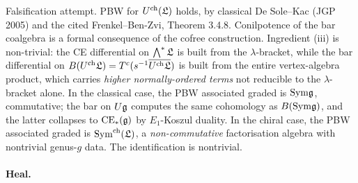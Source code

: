 Falsification attempt. PBW for $U^{\mathrm{ch}}(\mathfrak{L})$ holds, by
classical De Sole--Kac (JGP 2005) and the cited Frenkel--Ben-Zvi,
Theorem 3.4.8. Conilpotence of the bar coalgebra is a formal
consequence of the cofree construction. Ingredient (iii) is
non-trivial: the CE differential on $\bigwedge^* \mathfrak{L}$ is built
from the $\lambda$-bracket, while the bar differential on
$B(U^{\mathrm{ch}}\mathfrak{L}) = T^c(s^{-1}\overline{U^{\mathrm{ch}}\mathfrak{L}})$
is built from the entire vertex-algebra product, which carries
\emph{higher normally-ordered terms} not reducible to the
$\lambda$-bracket alone. In the classical case, the PBW associated
graded is $\mathrm{Sym} \mathfrak{g}$, commutative; the bar on $U\mathfrak{g}$ computes
the same cohomology as $B(\mathrm{Sym}\mathfrak{g})$, and the latter
collapses to $\mathrm{CE}_*(\mathfrak{g})$ by $E_1$-Koszul duality. In the chiral
case, the PBW associated graded is $\mathrm{Sym}^{\mathrm{ch}}(\mathfrak{L})$,
a \emph{non-commutative} factorisation algebra with nontrivial
genus-$g$ data. The identification is nontrivial.

\paragraph{Heal.}

